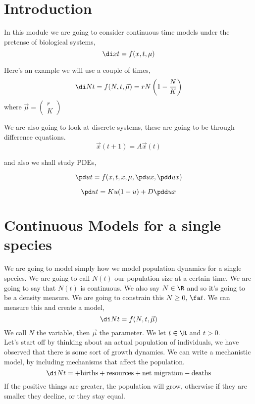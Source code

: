 
\section{Introduction}

In this module we are going to consider continuous time models under the pretense of biological systems,
$$ \di x t = f(x, t, \mu) $$

\begin{eg}
  Here's an example we will use a couple of times,
  $$ \di N t = f(N, t, \vec \mu) = rN \left( 1 - \frac{N}{K} \right) $$
  where $\vec\mu = \begin{pmatrix}
    r \\ K
  \end{pmatrix}$
\end{eg}

We are also going to look at discrete systems, these are going to be through difference equations.
$$ \vec x (t + 1) = A\vec x(t) $$

and also we shall study PDEs,

$$ \pd u t = f(x, t, x, \mu, \pd u x, \pdd u x) $$

\begin{eg}
  $$ \pd u t = Ku(1 - u) + D\pdd u x $$
\end{eg}


\section{Continuous Models for a single species}
We are going to model simply how we model population dynamics for a single species. We are going to call $N(t)$ our population size at a certain time. We are going to say that $N(t)$ is continuous. We also say $N \in \R$ and so it's going to be a density measure. We are going to constrain this $N \ge 0, \,\fa t$. We can measure this and create a model,
$$ \di N t = f(N, t, \vec \mu) $$
We call $N$ the variable, then $\vec \mu$ the parameter. We let $t \in \R$ and $t > 0$. \\

Let's start off by thinking about an actual population of individuals, we have observed that there is some sort of growth dynamics. We can write a mechanistic model, by including mechanisms that affect the population.
$$ \di N t =  + \text{births} + \text{resources} + \text{net migration} - \text{deaths}  $$
If the positive things are greater, the population will grow, otherwise if they are smaller they decline, or they stay equal. \\

